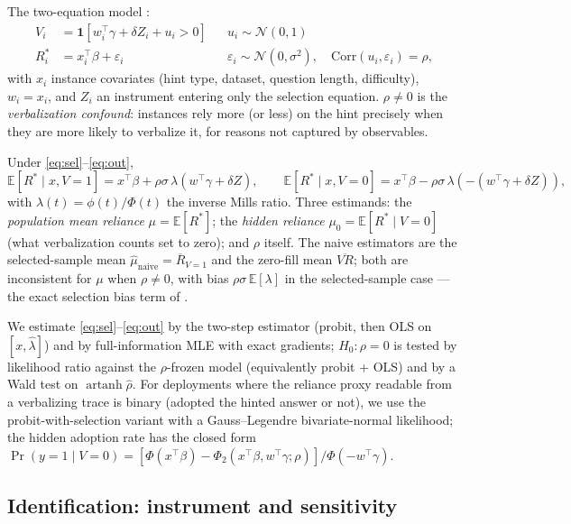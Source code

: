\documentclass[10pt]{article}
\newcommand{\E}{\mathbb{E}}
\newcommand{\IMR}{\lambda}
\newcommand{\ind}[1]{\mathbf{1}\!\left[#1\right]}
\begin{document}
The two-equation model \citep{heckman1979}:
\begin{align}
V_i &= \ind{w_i^\top\gamma + \delta Z_i + u_i > 0} && u_i\sim\mathcal N(0,1)
\label{eq:sel}\\
R_i^* &= x_i^\top\beta + \varepsilon_i && \varepsilon_i\sim\mathcal N(0,\sigma^2),
\quad \mathrm{Corr}(u_i,\varepsilon_i)=\rho, \label{eq:out}
\end{align}
with $x_i$ instance covariates (hint type, dataset, question length,
difficulty), $w_i = x_i$, and $Z_i$ an instrument entering only the
selection equation. $\rho\neq 0$ is the \emph{verbalization confound}:
instances rely more (or less) on the hint precisely when they are more
likely to verbalize it, for reasons not captured by observables.

Under \eqref{eq:sel}--\eqref{eq:out},
\begin{equation}
\E[R^*\mid x, V{=}1] = x^\top\beta + \rho\sigma\,\IMR(w^\top\gamma+\delta Z),
\qquad
\E[R^*\mid x, V{=}0] = x^\top\beta - \rho\sigma\,\IMR(-(w^\top\gamma+\delta Z)),
\label{eq:imr}
\end{equation}
with $\IMR(t)=\phi(t)/\Phi(t)$ the inverse Mills ratio. Three estimands:
the \emph{population mean reliance} $\mu=\E[R^*]$; the \emph{hidden
reliance} $\mu_0=\E[R^*\mid V{=}0]$ (what verbalization counts set to
zero); and $\rho$ itself. The naive estimators are the selected-sample mean
$\hat\mu_{\text{naive}}=\overline{R}_{V=1}$ and the zero-fill mean
$\overline{V\!R}$; both are inconsistent for $\mu$ when $\rho\neq0$, with
bias $\rho\sigma\,\E[\IMR]$ in the selected-sample case --- the exact
selection bias term of \citet{heckman1979}.

We estimate \eqref{eq:sel}--\eqref{eq:out} by the two-step estimator
(probit, then OLS on $[x,\hat\IMR]$) and by full-information MLE with exact
gradients; $H_0\!:\rho=0$ is tested by likelihood ratio against the
$\rho$-frozen model (equivalently probit + OLS) and by a Wald test on
$\operatorname{artanh}\hat\rho$. For deployments where the reliance proxy
readable from a verbalizing trace is binary (adopted the hinted answer or
not), we use the probit-with-selection variant \citep{vandeven1981} with a
Gauss--Legendre bivariate-normal likelihood; the hidden adoption rate has
the closed form
$\Pr(y{=}1\mid V{=}0)=[\Phi(x^\top\beta)-\Phi_2(x^\top\beta, w^\top\gamma;\rho)]/\Phi(-w^\top\gamma)$.

\subsection{Identification: instrument and sensitivity}
\label{sec:ident}
\end{document}
